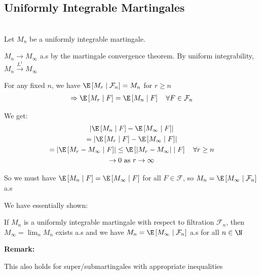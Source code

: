 \subsection{Uniformly Integrable Martingales}\hfill\\
\noindent Let $M_n$ be a uniformly integrable martingale.\par

\noindent $M_n\to M_\infty$ a.s by the martingale convergence theorem. By uniform integrability, $M_n\stackrel{L^1}{\to}M_\infty$
\par\bigskip
\noindent For any fixed $n$, we have $\E\left[M_r\mid\mathcal{F}_n\right] = M_n$ for $r\geq n$
\begin{equation*}
  \begin{gathered}
    \Rightarrow \E\left[M_r\mid F\right] = \E\left[M_n\mid F\right]\quad\forall F\in \mathcal{F}_n
  \end{gathered}
\end{equation*}\par
\noindent We get:
\begin{equation*}
  \begin{gathered}
    \left|\E\left[M_n\mid F\right]-\E\left[M_\infty\mid F\right]\right|\\
    = \left|\E\left[M_r\mid F\right]-\E\left[M_\infty\mid F\right]\right|\\
    =\left|\E\left[M_r-M_\infty\mid F\right]\right|\leq \E\left[\left|M_r-M_\infty\right|\mid F\right]\quad\forall r\geq n\\
    \to0\text{ as } r\to\infty
  \end{gathered}
\end{equation*}\par
\noindent So we must have $\E\left[M_n\mid F\right] = \E\left[M_\infty\mid F\right]$ for all $F\in\mathcal{F}$, so $M_n = \E\left[M_\infty\mid \mathcal{F}_n\right]$ a.s
\par\bigskip
\noindent We have essentially shown:
\par\bigskip
\begin{theo}[]{}
  If $M_n$ is a uniformly integrable martingale with respect to filtration $\mathcal{F}_n$, then $M_\infty = \lim_{n}M_n$ exists a.s and we have $M_n = \E\left[M_\infty\mid\mathcal{F}_n\right]$ a.s for all $n\in\N$
\end{theo}
\par\bigskip
\noindent\textbf{Remark:}\par
\noindent This also holds for super/submartingales with appropriate inequalities
\par\bigskip
